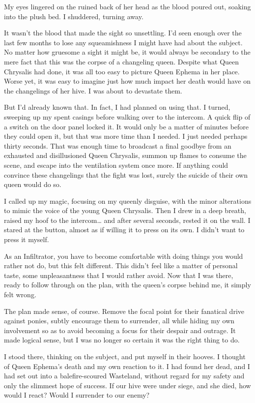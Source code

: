 My eyes lingered on the ruined back of her head as the blood poured out, soaking into the plush bed. I shuddered, turning away.

It wasn’t the blood that made the sight so unsettling. I’d seen enough over the last few months to lose any squeamishness I might have had about the subject. No matter how gruesome a sight it might be, it would always be secondary to the mere fact that this was the corpse of a changeling queen. Despite what Queen Chrysalis had done, it was all too easy to picture Queen Ephema in her place. Worse yet, it was easy to imagine just how much impact her death would have on the changelings of her hive. I was about to devastate them.

But I’d already known that. In fact, I had planned on using that. I turned, sweeping up my spent casings before walking over to the intercom. A quick flip of a switch on the door panel locked it. It would only be a matter of minutes before they could open it, but that was more time than I needed. I just needed perhaps thirty seconds. That was enough time to broadcast a final goodbye from an exhausted and disillusioned Queen Chrysalis, summon up flames to consume the scene, and escape into the ventilation system once more. If anything could convince these changelings that the fight was lost, surely the suicide of their own queen would do so.

I called up my magic, focusing on my queenly disguise, with the minor alterations to mimic the voice of the young Queen Chrysalis. Then I drew in a deep breath, raised my hoof to the intercom… and after several seconds, rested it on the wall. I stared at the button, almost as if willing it to press on its own. I didn’t want to press it myself.

As an Infiltrator, you have to become comfortable with doing things you would rather not do, but this felt different. This didn’t feel like a matter of personal taste, some unpleasantness that I would rather avoid. Now that I was there, ready to follow through on the plan, with the queen’s corpse behind me, it simply felt wrong.

The plan made sense, of course. Remove the focal point for their fanatical drive against ponies, subtly encourage them to surrender, all while hiding my own involvement so as to avoid becoming a focus for their despair and outrage. It made logical sense, but I was no longer so certain it was the right thing to do.

I stood there, thinking on the subject, and put myself in their hooves. I thought of Queen Ephema’s death and my own reaction to it. I had found her dead, and I had set out into a balefire-scoured Wasteland, without regard for my safety and only the slimmest hope of success. If our hive were under siege, and she died, how would I react? Would I surrender to our enemy?

